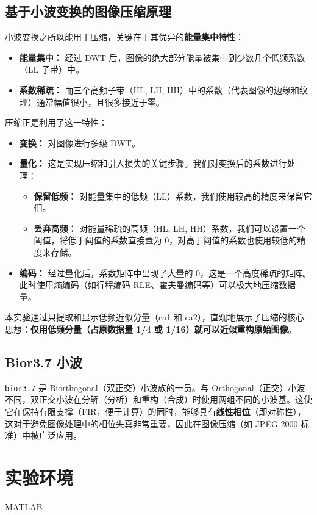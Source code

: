\documentclass[a4paper]{ctexart}
\begin{document}
	\subsection{基于小波变换的图像压缩原理}
	小波变换之所以能用于压缩，关键在于其优异的\textbf{能量集中特性}：
	\begin{itemize}
		\item \textbf{能量集中：} 经过 DWT 后，图像的绝大部分能量被集中到少数几个低频系数（LL 子带）中。
		\item \textbf{系数稀疏：} 而三个高频子带（HL, LH, HH）中的系数（代表图像的边缘和纹理）通常幅值很小，且很多接近于零。
	\end{itemize}
	压缩正是利用了这一特性：
	\begin{itemize}
		\item \textbf{变换：} 对图像进行多级 DWT。
		\item \textbf{量化：} 这是实现压缩和引入损失的关键步骤。我们对变换后的系数进行处理：
		\begin{itemize}
			\item \textbf{保留低频：} 对能量集中的低频（LL）系数，我们使用较高的精度来保留它们。
			\item \textbf{丢弃高频：} 对能量稀疏的高频（HL, LH, HH）系数，我们可以设置一个阈值，将低于阈值的系数直接置为 0，对高于阈值的系数也使用较低的精度来存储。
		\end{itemize}
		\item \textbf{编码：} 经过量化后，系数矩阵中出现了大量的 0，这是一个高度稀疏的矩阵。此时使用熵编码（如行程编码 RLE、霍夫曼编码等）可以极大地压缩数据量。
	\end{itemize}
	本实验通过只提取和显示低频近似分量（ca1 和 ca2），直观地展示了压缩的核心思想：\textbf{仅用低频分量（占原数据量 1/4 或 1/16）就可以近似重构原始图像}。
	
	\subsection{Bior3.7 小波}
	\texttt{bior3.7} 是 Biorthogonal（双正交）小波族的一员。与 Orthogonal（正交）小波不同，双正交小波在分解（分析）和重构（合成）时使用两组不同的小波基。这使它在保持有限支撑（FIR，便于计算）的同时，能够具有\textbf{线性相位}（即对称性），这对于避免图像处理中的相位失真非常重要，因此在图像压缩（如 JPEG 2000 标准）中被广泛应用。
	
	\section{实验环境}
	MATLAB
	
\end{document}
